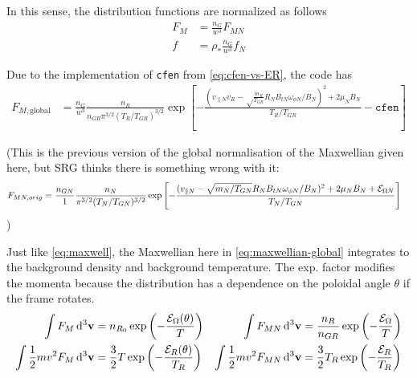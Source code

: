 In this sense, the distribution functions are normalized as follows 
\begin{align} 
F_M &= 
\frac{n_G}{ w^3} F_{MN} \\
f &= \rho_* \frac{n_G}{w^3} f_N
\end{align}

Due to the implementation of \texttt{cfen} from \eqref{eq:cfen-vs-ER}, the code has
\begin{align}
  F_{M,\mathrm{global}}&=\frac{n_G}{w^3}\frac{n_R }{n_{GR} \pi^{3/2} (T_R/T_{GR})^{3/2} } \exp \left [ - \frac{ 
\left(v_{\parallel N}v_R - \sqrt\frac{m_R}{T_{GR}}R_N B_{tN} \omega_{\phi N} / B_N\right)^2 + 2 \mu_N B_N
}{ T_R/T_{GR}}
- 
\mathtt{cfen} \right ] 
\end{align}

(This is the previous version of the global normalisation of the
Maxwellian given here, but SRG thinks there is something wrong with it:
\begin{align}
F_{MN,orig}&= \frac{n_{GN}}{1} \frac{n_N }{ \pi^{3/2} (T_N / T_{GN})^{3/2} } \exp \left [ - \frac{ 
(v_{\parallel N} - \sqrt{m_N/T_{GN}} R_N B_{tN} \omega_{\phi N} / B_N)^2 + 2 \mu_N B_N + 
{\cal E}_{\Omega N} }{ T_N / T_{GN}} \right ] 
\end{align}
)

Just like \eqref{eq:maxwell}, the Maxwellian here in
\eqref{eq:maxwellian-global} integrates to the background density and
background temperature. The exp. factor modifies the momenta because
the distribution has a dependence on the poloidal angle $\theta$ if the frame rotates.
\begin{align}
\int F_M \, {\rm d}^3 {\bf v} &= n_{R_0} \exp\left(-\frac{\mathcal{E}_\Omega (\theta)}{T}\right) & \int F_{MN} \, {\rm d}^3 {\bf v} &= \frac{n_{R}}{n_{GR}} \exp\left(-\frac{\mathcal{E}_\Omega}{T}\right)
\\
\int \frac{1}{ 2} m v^2 F_M \, {\rm d}^3 {\bf v} &= \frac{3 }{ 2} T \exp\left(-\frac{\mathcal{E}_R(\theta)}{T_R}\right)
&
\int \frac{1}{ 2} m v^2 F_{MN} \, {\rm d}^3 {\bf v} &= \frac{3 }{ 2} T_R \exp\left(-\frac{\mathcal{E}_R}{T_R}\right)
\end{align}


